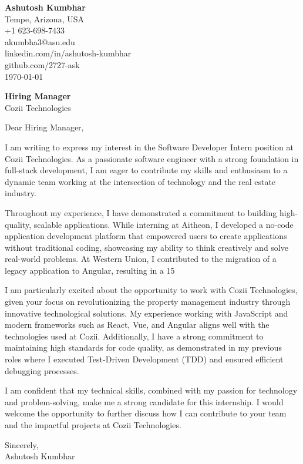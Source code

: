 \documentclass[11pt]{article}
\begin{document}
\begin{flushleft}
\textbf{Ashutosh Kumbhar} \\
Tempe, Arizona, USA \\
+1 623-698-7433 \\
akumbha3@asu.edu \\
linkedin.com/in/ashutosh-kumbhar \\
github.com/2727-ask \\
\today
\end{flushleft}
\vspace{0.5em}
\textbf{Hiring Manager} \\
Cozii Technologies \\
\vspace{1em}

Dear Hiring Manager,

I am writing to express my interest in the Software Developer Intern position at Cozii Technologies. As a passionate software engineer with a strong foundation in full-stack development, I am eager to contribute my skills and enthusiasm to a dynamic team working at the intersection of technology and the real estate industry.

Throughout my experience, I have demonstrated a commitment to building high-quality, scalable applications. While interning at Aitheon, I developed a no-code application development platform that empowered users to create applications without traditional coding, showcasing my ability to think creatively and solve real-world problems. At Western Union, I contributed to the migration of a legacy application to Angular, resulting in a 15%

I am particularly excited about the opportunity to work with Cozii Technologies, given your focus on revolutionizing the property management industry through innovative technological solutions. My experience working with JavaScript and modern frameworks such as React, Vue, and Angular aligns well with the technologies used at Cozii. Additionally, I have a strong commitment to maintaining high standards for code quality, as demonstrated in my previous roles where I executed Test-Driven Development (TDD) and ensured efficient debugging processes.

I am confident that my technical skills, combined with my passion for technology and problem-solving, make me a strong candidate for this internship. I would welcome the opportunity to further discuss how I can contribute to your team and the impactful projects at Cozii Technologies.

Sincerely, \\
Ashutosh Kumbhar
\end{document}
